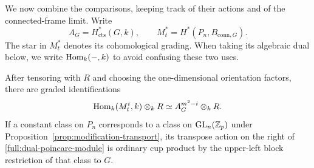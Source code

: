 We now combine the comparisons, keeping track of their actions
and of the connected-frame limit.  Write
\[
 A_G=H^*_{\mathrm{cts}}(G,k),\qquad
 M_t^*=H^*(P_n,B_{\mathrm{conn},G}).
\]
The star in $M_t^*$ denotes its cohomological grading.
When taking its algebraic dual below, we write $\operatorname{Hom}_k(-,k)$
to avoid confusing these two uses.

\begin{proposition}
\label{full:surviving-module}
After tensoring with $R$ and choosing the one-dimensional
orientation factors, there are graded identifications
\begin{equation}
\label{full:dual-poincare-module}
 \operatorname{Hom}_k(M_t^i,k)\otimes_kR
       \simeq A_G^{m^2-i}\otimes_kR.
\end{equation}
If a constant class on $P_n$ corresponds to a class on
$\operatorname{GL}_n(\mathbb Z_p)$ under Proposition~\ref{prop:modification-transport},
its transpose action on the right of
\eqref{full:dual-poincare-module} is ordinary cup product by
the upper-left block restriction of that class to $G$.
\end{proposition}

